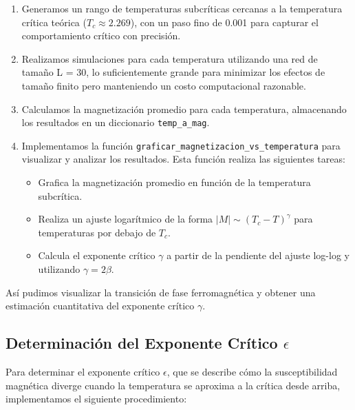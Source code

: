 \documentclass[twocolumn]{article}
\begin{document}
\begin{enumerate}
    \item Generamos un rango de temperaturas subcríticas cercanas a la temperatura crítica teórica ($T_c \approx 2.269$), con un paso fino de 0.001 para capturar el comportamiento crítico con precisión.
    
    \item Realizamos simulaciones para cada temperatura utilizando una red de tamaño L = 30, lo suficientemente grande para minimizar los efectos de tamaño finito pero manteniendo un costo computacional razonable.
    
    \item Calculamos la magnetización promedio para cada temperatura, almacenando los resultados en un diccionario \texttt{temp\_a\_mag}.
    
    \item Implementamos la función \texttt{graficar\_magnetizacion\_vs\_temperatura} para visualizar y analizar los resultados. Esta función realiza las siguientes tareas:
    \begin{itemize}
        \item Grafica la magnetización promedio en función de la temperatura subcrítica.
        \item Realiza un ajuste logarítmico de la forma $|M| \sim (T_c - T)^\gamma$ para temperaturas por debajo de $T_c$.
        \item Calcula el exponente crítico $\gamma$ a partir de la pendiente del ajuste log-log y utilizando $\gamma = 2\beta$.
    \end{itemize}
\end{enumerate}

Así pudimos visualizar la transición de fase ferromagnética y obtener una estimación cuantitativa del exponente crítico $\gamma$.

\subsection*{Determinación del Exponente Crítico $\epsilon$}

Para determinar el exponente crítico $\epsilon$, que se describe cómo la susceptibilidad magnética diverge cuando la temperatura se aproxima a la crítica desde arriba, implementamos el siguiente procedimiento:
\end{document}

